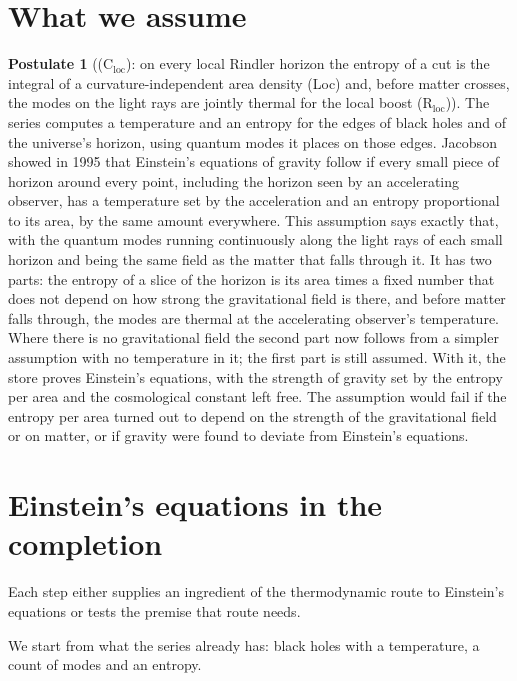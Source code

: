 \documentclass[11pt]{article}
\theoremstyle{definition}
\newtheorem{postulate}[theorem]{Postulate}
\theoremstyle{plain}
\begin{document}
\section{What we assume}

\begin{postulate}[(C$_{\mathrm{loc}}$): on every local Rindler horizon the entropy of a cut is the integral of a curvature-independent area density (Loc) and, before matter crosses, the modes on the light rays are jointly thermal for the local boost (R$_{\mathrm{loc}}$)]\label{c:synthesis.c-loc-local-horizon-premise}
The series computes a temperature and an entropy for the edges of black holes and of the universe's horizon, using quantum modes it places on those edges. Jacobson showed in 1995 that Einstein's equations of gravity follow if every small piece of horizon around every point, including the horizon seen by an accelerating observer, has a temperature set by the acceleration and an entropy proportional to its area, by the same amount everywhere. This assumption says exactly that, with the quantum modes running continuously along the light rays of each small horizon and being the same field as the matter that falls through it. It has two parts: the entropy of a slice of the horizon is its area times a fixed number that does not depend on how strong the gravitational field is there, and before matter falls through, the modes are thermal at the accelerating observer's temperature. Where there is no gravitational field the second part now follows from a simpler assumption with no temperature in it; the first part is still assumed. With it, the store proves Einstein's equations, with the strength of gravity set by the entropy per area and the cosmological constant left free. The assumption would fail if the entropy per area turned out to depend on the strength of the gravitational field or on matter, or if gravity were found to deviate from Einstein's equations.
\end{postulate}

\section{Einstein's equations in the completion}

Each step either supplies an ingredient of the thermodynamic route to Einstein's equations or tests the premise that route needs.

We start from what the series already has: black holes with a temperature, a count of modes and an entropy.
\end{document}
